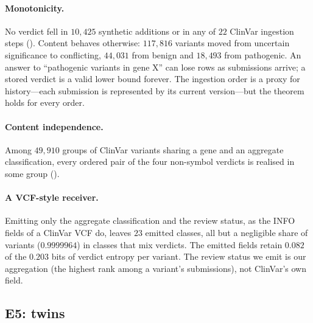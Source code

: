 \documentclass[11pt,twocolumn,a4paper]{article}
\theoremstyle{plain}
\theoremstyle{definition}
\theoremstyle{remark}
\begin{document}
\paragraph{Monotonicity.} No verdict fell in $10{,}425$ synthetic additions or in
any of $22$ ClinVar ingestion steps (). Content behaves
otherwise: $117{,}816$ variants moved from uncertain significance to
conflicting, $44{,}031$ from benign and $18{,}493$ from pathogenic. An answer to
``pathogenic variants in gene X'' can lose rows as submissions arrive; a stored
verdict is a valid lower bound forever. The ingestion order is a proxy for
history---each submission is represented by its current version---but the
theorem holds for every order.

\paragraph{Content independence.} Among $49{,}910$ groups of ClinVar variants
sharing a gene and an aggregate classification, every ordered pair of the four
non-symbol verdicts is realised in some group ().

\paragraph{A VCF-style receiver.} Emitting only the aggregate classification and
the review status, as the INFO fields of a ClinVar VCF do, leaves $23$ emitted
classes, all but a negligible share of variants ($0.9999964$) in classes that
mix verdicts. The emitted fields retain $0.082$ of the $0.203$ bits of verdict
entropy per variant. The review status we emit is our aggregation (the
highest rank among a variant's submissions), not ClinVar's own field.

\subsection{E5: twins}
\label{sec:e5}
\end{document}
